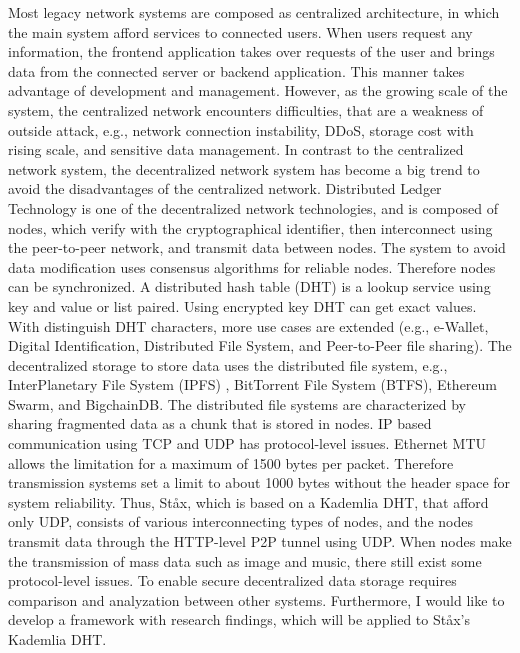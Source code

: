 \documentclass{article}
\begin{document}
Most legacy network systems are composed as centralized architecture, in which the main system afford services to connected users. When users request any information, the frontend application takes over requests of the user and brings data from the connected server or backend application. This manner takes advantage of development and management. However, as the growing scale of the system, the centralized network encounters difficulties, that are a weakness of outside attack, e.g., network connection instability, DDoS, storage cost with rising scale, and sensitive data management. In contrast to the centralized network system, the decentralized network system has become a big trend to avoid the disadvantages of the centralized network. Distributed Ledger Technology is one of the decentralized network technologies, and is composed of nodes, which verify with the cryptographical identifier, then interconnect using the peer-to-peer network, and transmit data between nodes. The system to avoid data modification uses consensus algorithms for reliable nodes. Therefore nodes can be synchronized. A distributed hash table (DHT) \cite{sivaraja2008efficient} is a lookup service using key and value or list paired. Using encrypted key DHT can get exact values. With distinguish DHT characters, more use cases are extended (e.g., e-Wallet, Digital Identification, Distributed File System, and Peer-to-Peer file sharing). The decentralized storage to store data uses the distributed file system, e.g., InterPlanetary File System (IPFS) \cite{IPFS}\cite{benet2014ipfs}, BitTorrent File System (BTFS)\cite{BTFS}, Ethereum Swarm, and BigchainDB. The distributed file systems are characterized by sharing fragmented data as a chunk that is stored in nodes. IP based communication using TCP and UDP has protocol-level issues\cite{rfc791}\cite{rfc815}. Ethernet MTU allows the limitation for a maximum of 1500 bytes per packet. Therefore transmission systems set a limit to about 1000 bytes without the header space for system reliability\cite{ietf-intarea-frag-fragile-17}. Thus, St\aa x, which is based on a Kademlia DHT\cite{maymounkov2002kademlia}, that afford only UDP, consists of various interconnecting types of nodes, and the nodes transmit data through the HTTP-level P2P tunnel using UDP. When nodes make the transmission of mass data such as image and music, there still exist some protocol-level issues. To enable secure decentralized data storage requires comparison and analyzation between other systems. Furthermore, I would like to develop a framework with research findings, which will be applied to St\aa x's Kademlia DHT.
\end{document}

